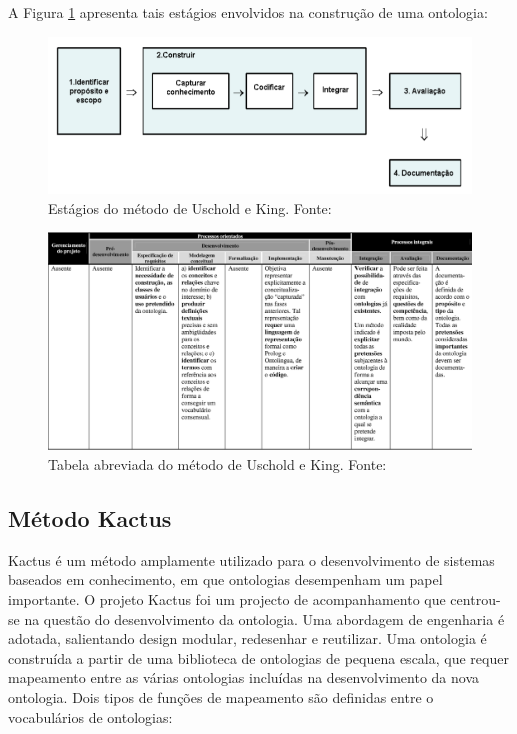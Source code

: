 A Figura \ref{fig:estagios_uschold_king} apresenta tais estágios envolvidos na construção de uma ontologia:

\begin{figure}[h] 
\centering 
\includegraphics[scale=0.5]{Figuras/5.png}
\caption[Estágios do método de Uschold e King]{Estágios do método de Uschold e King. Fonte: \cite{DanielaLucas2008}}
\label{fig:estagios_uschold_king}
\end{figure}

\pagebreak

\begin{figure}[h] 
\centering 
\includegraphics[scale=0.3]{Figuras/6.png} 
\caption[Tabela abreviada do método de Uschold e King]{Tabela abreviada do método de Uschold e King. Fonte: \cite{DanielaLucas2008}}
\end{figure}

\subsection{Método Kactus} 
 Kactus é um método amplamente utilizado para o desenvolvimento de sistemas baseados em conhecimento, em que ontologias
 desempenham um papel importante. O projeto Kactus foi um projecto de acompanhamento que centrou-se na questão do
 desenvolvimento da ontologia. Uma abordagem de engenharia é adotada, salientando design modular, redesenhar e reutilizar.
 Uma ontologia é construída a partir de uma biblioteca de ontologias de pequena escala, que requer mapeamento entre as várias
 ontologias incluídas na desenvolvimento da nova ontologia. Dois tipos de funções de mapeamento são definidas entre o
 vocabulários de ontologias:
 
